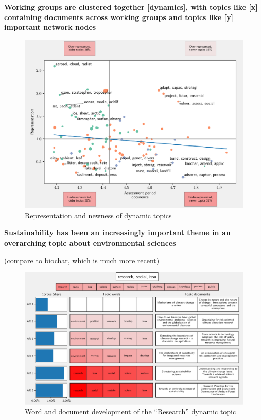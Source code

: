 \documentclass{article}
\begin{document}
\bigskip
\noindent\textbf{Working groups are clustered together [dynamics], with topics like [x] containing documents across working groups and topics like [y] important network nodes}


\begin{figure}
	\begin{center}
		\includegraphics[width=1\linewidth]{plots/ipcc_representation/ipcc_rep_new665_all.pdf}
		\caption{Representation and newness of dynamic topics}
		\label{}
	\end{center}
\end{figure}


\bigskip
\noindent\textbf{Sustainability has been an increasingly important theme in an overarching topic about environmental sciences}

(compare to biochar, which is much more recent)

\begin{figure}
	\begin{center}
		\includegraphics[width=1\linewidth]{plots/single_topic_3_11046.pdf}
		\caption{Word and document development of the ``Research'' dynamic topic}
		\label{}
	\end{center}
\end{figure}
\end{document}

